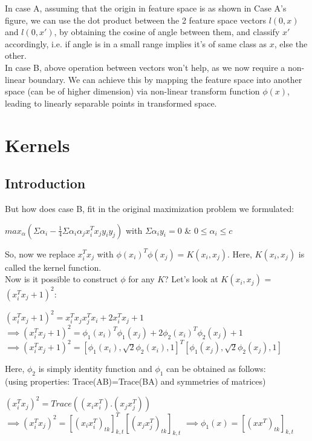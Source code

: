\documentclass[11pt, twosides]{article}
\begin{document}
In case A, assuming that the origin in feature space is as shown in Case A's figure, we can use the dot product between the 2 feature space vectors $l(0,x)$ and $l(0,x')$, by obtaining the cosine of angle between them, and classify $x'$ accordingly, i.e. if angle is in a small range implies it's of same class as $x$, else the other. \\
In case B, above operation between vectors won't help, as we now require a non-linear boundary. We can achieve this by mapping the feature space into another space (can be of higher dimension) via non-linear transform function $\phi(x)$, leading to linearly separable points in transformed space.
\section{Kernels}
\subsection{Introduction}
But how does case B, fit in the original maximization problem we formulated: 
\begin{center}
    $max_{\alpha} (\Sigma \alpha_i - \frac{1}{4}\Sigma\alpha_i\alpha_j x_{i}^T x_{j}y_{i}y_{j})$ with 
    $\Sigma \alpha_{i}y_{i} = 0$ \& $0 \leq \alpha_i \leq c$ \\
\end{center}
So, now we replace $x_{i}^T x_{j}$ with $\phi(x_{i})^T \phi(x_j) = K(x_i,x_j)$. Here, $K(x_i,x_j)$ is called the kernel function. \\
Now is it possible to construct $\phi$ for any $K$? Let's look at $K(x_i,x_j)$ = $(x_{i}^Tx_j + 1)^2$: 
\begin{center}
    $(x_{i}^Tx_j + 1)^2 = x_{i}^Tx_{j}x_{j}^Tx_{i} + 2x_{i}^Tx_j +1$ \\
    $\implies (x_{i}^Tx_j + 1)^2 = \phi_1(x_i)^T\phi_1(x_j) + 2\phi_2(x_i)^T\phi_2(x_j) + 1$ \\
    $\implies (x_{i}^Tx_j + 1)^2 = [\phi_1(x_i), \sqrt{2}\phi_2(x_i), 1]^T[\phi_1(x_j), \sqrt{2}\phi_2(x_j), 1]$
\end{center}
Here, $\phi_2$ is simply identity function and $\phi_1$ can be obtained as follows:\\ (using properties: Trace(AB)=Trace(BA) and symmetries of matrices)
\begin{center}
    $(x_{i}^Tx_j)^2 = Trace((x_{i}x_{i}^T).(x_{j}x_{j}^T))$ 
    $\implies (x_{i}^Tx_j)^2 = [(x_{i}x_{i}^T)_{tk}]_{k,t}^T[(x_{j}x_{j}^T)_{tk}]_{k,t}$ 
    $\implies \phi_1(x) = [(xx^T)_{tk}]_{k,t}$
\end{center}
\end{document}
